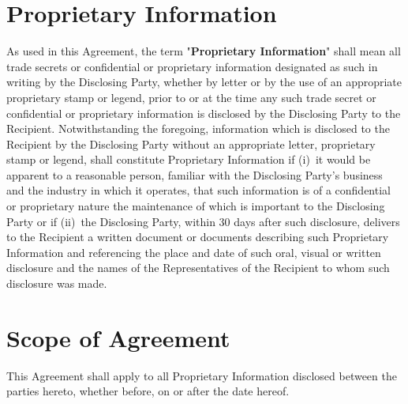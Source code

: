 \documentclass[10pt]{article}
\begin{document}
\section{Proprietary Information}
As used in this Agreement, the term "{\bf Proprietary Information}" shall mean all trade secrets or confidential or proprietary information designated as such in writing by the Disclosing Party, whether by letter or by the use of an appropriate proprietary stamp or legend, prior to or at the time any such trade secret or confidential or proprietary information is disclosed by the Disclosing Party to the Recipient. Notwithstanding the foregoing, information which is disclosed to the Recipient by the Disclosing Party without an appropriate letter, proprietary stamp or legend, shall constitute Proprietary Information if (i) it would be apparent to a reasonable person, familiar with the Disclosing Party’s business and the industry in which it operates, that such information is of a confidential or proprietary nature the maintenance of which is important to the Disclosing Party or if (ii) the Disclosing Party, within 30 days after such disclosure, delivers to the Recipient a written document or documents describing such Proprietary Information and referencing the place and date of such oral, visual or written disclosure and the names of the Representatives of the Recipient to whom such disclosure was made.

\section{Scope of Agreement}
This Agreement shall apply to all Proprietary Information disclosed between the parties hereto, whether before, on or after the date hereof.
\end{document}
